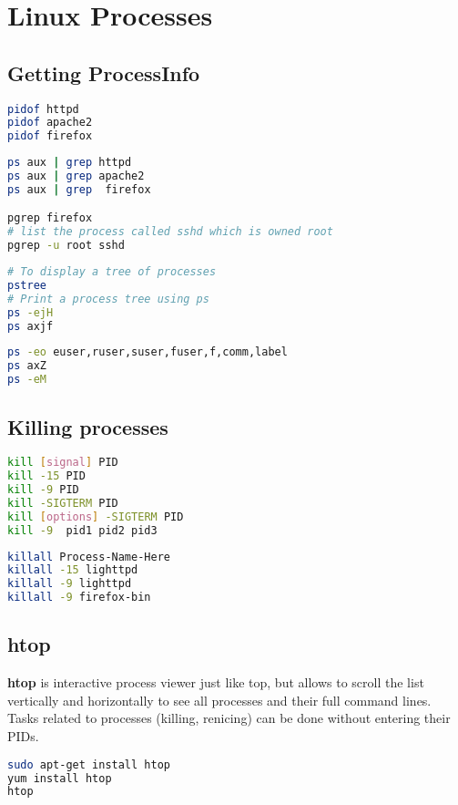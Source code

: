 \section{Linux Processes}
\subsection{Getting ProcessInfo}
\begin{lstlisting}[language=bash,caption={Getting pid}]
pidof httpd
pidof apache2
pidof firefox
\end{lstlisting}

\begin{lstlisting}[language=bash,caption={Getting all pids}]
ps aux | grep httpd
ps aux | grep apache2
ps aux | grep  firefox

pgrep firefox
# list the process called sshd which is owned root
pgrep -u root sshd
\end{lstlisting}

\begin{lstlisting}[language=bash,caption={Process Tree}]
# To display a tree of processes
pstree
# Print a process tree using ps
ps -ejH
ps axjf
\end{lstlisting}

\begin{lstlisting}[language=bash,caption={Get SecurityInfo}]
ps -eo euser,ruser,suser,fuser,f,comm,label
ps axZ
ps -eM
\end{lstlisting}

\subsection{Killing processes}
\begin{lstlisting}[language=bash,caption={Kill command}]
kill [signal] PID
kill -15 PID
kill -9 PID
kill -SIGTERM PID
kill [options] -SIGTERM PID
kill -9  pid1 pid2 pid3
\end{lstlisting}

\begin{lstlisting}[language=bash,caption={KillAll command}]
killall Process-Name-Here
killall -15 lighttpd
killall -9 lighttpd
killall -9 firefox-bin
\end{lstlisting}
\subsection{htop}
\textbf{htop} is interactive process viewer just like top, but allows to scroll the list vertically and horizontally to see all processes and their full command lines. Tasks related to processes (killing, renicing) can be done without entering their PIDs.
\begin{lstlisting}[language=bash,caption={installing htop}]
sudo apt-get install htop
yum install htop
htop
\end{lstlisting}
